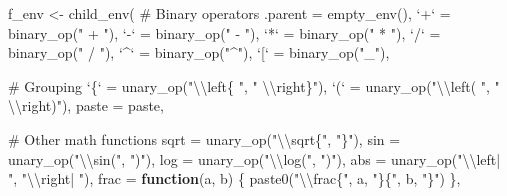 \documentclass[
]{krantz}
\makeatletter
\newenvironment{Shaded}{\begin{snugshade}}{\end{snugshade}}
\newcommand{\CharTok}[1]{\textcolor[rgb]{0.31,0.60,0.02}{#1}}
\newcommand{\CommentTok}[1]{\textcolor[rgb]{0.56,0.35,0.01}{\textit{#1}}}
\newcommand{\ControlFlowTok}[1]{\textcolor[rgb]{0.13,0.29,0.53}{\textbf{#1}}}
\newcommand{\DataTypeTok}[1]{\textcolor[rgb]{0.13,0.29,0.53}{#1}}
\newcommand{\KeywordTok}[1]{\textcolor[rgb]{0.13,0.29,0.53}{\textbf{#1}}}
\newcommand{\NormalTok}[1]{#1}
\newcommand{\StringTok}[1]{\textcolor[rgb]{0.31,0.60,0.02}{#1}}
\newenvironment{kframe}{%
\medskip{}
\setlength{\fboxsep}{.8em}
 \def\at@end@of@kframe{}%
 \ifinner\ifhmode%
  \def\at@end@of@kframe{\end{minipage}}%
  \begin{minipage}{\columnwidth}%
 \fi\fi%
 \def\FrameCommand##1{\hskip\@totalleftmargin \hskip-\fboxsep
 \colorbox{shadecolor}{##1}\hskip-\fboxsep
     \hskip-\linewidth \hskip-\@totalleftmargin \hskip\columnwidth}%
 \MakeFramed {\advance\hsize-\width
   \@totalleftmargin\z@ \linewidth\hsize
   \@setminipage}}%
 {\par\unskip\endMakeFramed%
 \at@end@of@kframe}
\renewenvironment{Shaded}{\begin{kframe}}{\end{kframe}}
\renewcommand{\KeywordTok} [1]{\textcolor[rgb]{0.00,0.44,0.13}{{#1}}}
\renewcommand{\DataTypeTok}[1]{\textcolor[rgb]{0.56,0.13,0.00}{{#1}}}
\renewcommand{\CharTok}    [1]{\textcolor[rgb]{0.25,0.44,0.63}{{#1}}}
\renewcommand{\StringTok}  [1]{\textcolor[rgb]{0.25,0.44,0.63}{{#1}}}
\renewcommand{\CommentTok} [1]{\textcolor[rgb]{0.38,0.63,0.69}{{#1}}}
\renewcommand{\NormalTok}  [1]{{#1}}
\makeatother
\begin{document}
\begin{Shaded}
\begin{Highlighting}[]
\NormalTok{f_env <-}\StringTok{ }\KeywordTok{child_env}\NormalTok{(}
  \CommentTok{# Binary operators}
  \DataTypeTok{.parent =} \KeywordTok{empty_env}\NormalTok{(),}
  \StringTok{`}\DataTypeTok{+}\StringTok{`}\NormalTok{ =}\StringTok{ }\KeywordTok{binary_op}\NormalTok{(}\StringTok{" + "}\NormalTok{),}
  \StringTok{`}\DataTypeTok{-}\StringTok{`}\NormalTok{ =}\StringTok{ }\KeywordTok{binary_op}\NormalTok{(}\StringTok{" - "}\NormalTok{),}
  \StringTok{`}\DataTypeTok{*}\StringTok{`}\NormalTok{ =}\StringTok{ }\KeywordTok{binary_op}\NormalTok{(}\StringTok{" * "}\NormalTok{),}
  \StringTok{`}\DataTypeTok{/}\StringTok{`}\NormalTok{ =}\StringTok{ }\KeywordTok{binary_op}\NormalTok{(}\StringTok{" / "}\NormalTok{),}
  \StringTok{`}\DataTypeTok{^}\StringTok{`}\NormalTok{ =}\StringTok{ }\KeywordTok{binary_op}\NormalTok{(}\StringTok{"^"}\NormalTok{),}
  \StringTok{`}\DataTypeTok{[}\StringTok{`}\NormalTok{ =}\StringTok{ }\KeywordTok{binary_op}\NormalTok{(}\StringTok{"_"}\NormalTok{),}
  
  \CommentTok{# Grouping}
  \StringTok{`}\DataTypeTok{\{}\StringTok{`}\NormalTok{ =}\StringTok{ }\KeywordTok{unary_op}\NormalTok{(}\StringTok{"}\CharTok{\textbackslash{}\textbackslash{}}\StringTok{left\{ "}\NormalTok{, }\StringTok{" }\CharTok{\textbackslash{}\textbackslash{}}\StringTok{right\}"}\NormalTok{),}
  \StringTok{`}\DataTypeTok{(}\StringTok{`}\NormalTok{ =}\StringTok{ }\KeywordTok{unary_op}\NormalTok{(}\StringTok{"}\CharTok{\textbackslash{}\textbackslash{}}\StringTok{left( "}\NormalTok{, }\StringTok{" }\CharTok{\textbackslash{}\textbackslash{}}\StringTok{right)"}\NormalTok{),}
  \DataTypeTok{paste =}\NormalTok{ paste,}
  
  \CommentTok{# Other math functions}
  \DataTypeTok{sqrt =} \KeywordTok{unary_op}\NormalTok{(}\StringTok{"}\CharTok{\textbackslash{}\textbackslash{}}\StringTok{sqrt\{"}\NormalTok{, }\StringTok{"\}"}\NormalTok{),}
  \DataTypeTok{sin =}  \KeywordTok{unary_op}\NormalTok{(}\StringTok{"}\CharTok{\textbackslash{}\textbackslash{}}\StringTok{sin("}\NormalTok{, }\StringTok{")"}\NormalTok{),}
  \DataTypeTok{log =}  \KeywordTok{unary_op}\NormalTok{(}\StringTok{"}\CharTok{\textbackslash{}\textbackslash{}}\StringTok{log("}\NormalTok{, }\StringTok{")"}\NormalTok{),}
  \DataTypeTok{abs =}  \KeywordTok{unary_op}\NormalTok{(}\StringTok{"}\CharTok{\textbackslash{}\textbackslash{}}\StringTok{left| "}\NormalTok{, }\StringTok{"}\CharTok{\textbackslash{}\textbackslash{}}\StringTok{right| "}\NormalTok{),}
  \DataTypeTok{frac =} \ControlFlowTok{function}\NormalTok{(a, b) \{}
    \KeywordTok{paste0}\NormalTok{(}\StringTok{"}\CharTok{\textbackslash{}\textbackslash{}}\StringTok{frac\{"}\NormalTok{, a, }\StringTok{"\}\{"}\NormalTok{, b, }\StringTok{"\}"}\NormalTok{)}
\NormalTok{  \},}
  

\end{Highlighting}
\end{Shaded}
\end{document}

